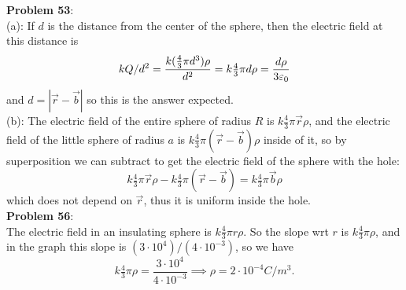 \documentclass{amsart}
\begin{document}
\textbf{Problem 53}:\\

(a): If $d$ is the distance from the center of the sphere, then the electric field at this distance is 
$$
kQ/d^2 = \frac{k(\tfrac43 \pi d^3)\rho}{d^2} = k\tfrac43 \pi d \rho = \frac{d\rho}{3\varepsilon_0}
$$
and $d=|\vec{r}-\vec{b}|$ so this is the answer expected.\\

(b): The electric field of the entire sphere of radius $R$ is $k\tfrac43 \pi \vec{r}\rho$, and the electric field of the little sphere of radius $a$ is $k\tfrac43 \pi (\vec{r}-\vec{b})\rho$ inside of it, so by superposition we can subtract to get the electric field of the sphere with the hole:
$$
k\tfrac43 \pi\vec{r}\rho - k\tfrac43 \pi(\vec{r}-\vec{b}) = k\tfrac43 \pi\vec{b}\rho 
$$
which does not depend on $\vec{r}$, thus it is uniform inside the hole.\\

\textbf{Problem 56}:\\

The electric field in an insulating sphere is $k\tfrac43 \pi r \rho$. So the slope wrt $r$ is $k\tfrac43 \pi \rho$, and in the graph this slope is $(3\cdot 10^4)/(4\cdot 10^{-3})$, so we have
$$
k\tfrac43 \pi \rho = \frac{3\cdot 10^4}{4\cdot 10^{-3}} \implies \rho = 2\cdot 10^{-4} C/m^3.
$$
\end{document}

